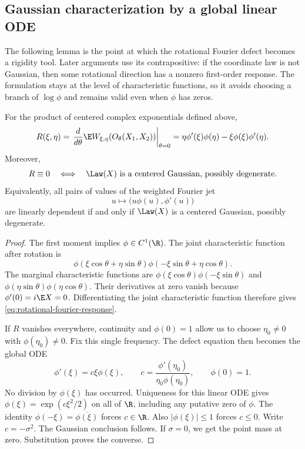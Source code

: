 \subsection{Gaussian characterization by a global linear ODE}
\label{sec:fourier-ode}

The following lemma is the point at which the rotational Fourier defect becomes a
rigidity tool.
Later arguments use its contrapositive: if the coordinate law is not
Gaussian, then some rotational direction has a nonzero first-order response.
The formulation stays at the level of characteristic functions, so it avoids
choosing a branch of \(\log\phi\) and remains valid even when \(\phi\) has
zeros.

\begin{lemma}
\label{lem:fourier-ode}
For the product of centered complex exponentials defined above,
\begin{equation}
 R(\xi,\eta)
 =\left.\frac{d}{d\theta}
       \E W_{\xi,\eta}(O_\theta(X_1,X_2))\right|_{\theta=0}
   =\eta\phi'(\xi)\phi(\eta)
          -\xi\phi(\xi)\phi'(\eta).
 \label{eq:rotational-fourier-response}
\end{equation}
Moreover,
\begin{equation}
 R\equiv0
 \quad\Longleftrightarrow\quad
 \Law(X)\text{ is a centered Gaussian, possibly degenerate}.
 \label{eq:fourier-gaussian-characterization}
\end{equation}
Equivalently, all pairs of values of the weighted Fourier jet
\[
 u\longmapsto\bigl(u\phi(u),\phi'(u)\bigr)
\]
are linearly dependent if and only if \(\Law(X)\) is a centered Gaussian,
possibly degenerate.
\end{lemma}
\begin{proof}
The first moment implies $\phi\in C^1(\R)$.
The joint characteristic function after rotation is
\[
 \phi(\xi\cos\theta+\eta\sin\theta)
 \phi(-\xi\sin\theta+\eta\cos\theta).
\]
The marginal characteristic functions are
$\phi(\xi\cos\theta)\phi(-\xi\sin\theta)$ and
$\phi(\eta\sin\theta)\phi(\eta\cos\theta)$.
Their derivatives at zero vanish because $\phi'(0)=i\E X=0$.
Differentiating the joint characteristic function therefore gives
\eqref{eq:rotational-fourier-response}.

If $R$ vanishes everywhere, continuity and $\phi(0)=1$ allow us to
choose $\eta_0\ne0$ with $\phi(\eta_0)\ne0$.
Fix this single frequency.
The defect equation then becomes the global ODE
\[
 \phi'(\xi)=c\xi\phi(\xi),\qquad
 c=\frac{\phi'(\eta_0)}{\eta_0\phi(\eta_0)},\qquad
 \phi(0)=1.
\]
No division by $\phi(\xi)$ has occurred.
Uniqueness for this linear ODE gives $\phi(\xi)=\exp(c\xi^2/2)$ on all of
$\R$, including any putative zero of $\phi$.
The identity $\phi(-\xi)=\overline{\phi(\xi)}$ forces $c\in\R$.
Also $|\phi(\xi)|\le1$ forces $c\le0$.
Write $c=-\sigma^2$.
The Gaussian conclusion follows.
If $\sigma=0$, we get the point mass at zero.
Substitution proves the converse.
\end{proof}

